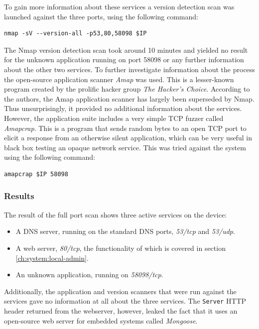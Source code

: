 To gain more information about these services a version detection scan was launched against the three ports, using the following command:
\begin{lstlisting}[frame=tb]
    nmap -sV --version-all -p53,80,58098 $IP
\end{lstlisting}
The Nmap version detection scan took around 10 minutes and yielded no result for the unknown application running on port 58098 or any further information about the other two services. To further investigate information about the process the open-source application scanner \textit{Amap} was used. This is a lesser-known program created by the prolific hacker group \textit{The Hacker's Choice}. According to the authors, the Amap application scanner has largely been superseded by Nmap. Thus unsurprisingly, it provided no additional information about the services. However, the application suite includes a very simple TCP fuzzer called \textit{Amapcrap}. This is a program that sends random bytes to an open TCP port to elicit a response from an otherwise silent application, which can be very useful in black box testing an opaque network service. This was tried against the system using the following command:
\begin{lstlisting}[frame=tb]
    amapcrap $IP 58098
\end{lstlisting}

\subsubsection{Results}
The result of the full port scan shows three active services on the device:
\begin{itemize}
    \item A DNS server, running on the standard DNS ports, \textit{53/tcp} and \textit{53/udp}.
    \item A web server, \textit{80/tcp}, the functionality of which is covered in section \ref{ch:system:local-admin}.
    \item An unknown application, running on \textit{58098/tcp}.
\end{itemize}
Additionally, the application and version scanners that were run against the services gave no information at all about the three services. The \texttt{Server} HTTP header returned from the webserver, however, leaked the fact that it uses an open-source web server for embedded systems called \textit{Mongoose}.

